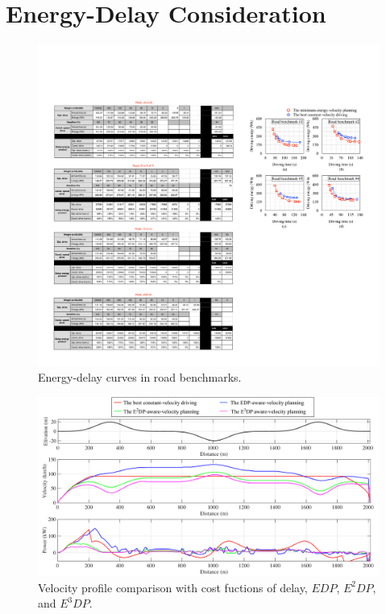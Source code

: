 \documentclass{IEEEtran}
\begin{document}
\section{Energy-Delay Consideration} \label{sec:ed_consideration}

\begin{figure} 	%
\centering
\includegraphics[width=\hsize]{Figures/ED_curve.pdf}
\caption{Energy-delay curves in road benchmarks.}
\label{fig:energy_delay_curve}
\end{figure} 

\begin{figure} %
\centering
\includegraphics[width=1.0\hsize]{Figures/EDP_velocity_planning.pdf}
\caption{Velocity profile comparison with cost fuctions of delay, $EDP$, $E^2DP$, and $E^3DP$.}
\label{fig:EDP_aware_velocity_planning}
\end{figure} 
\end{document}
